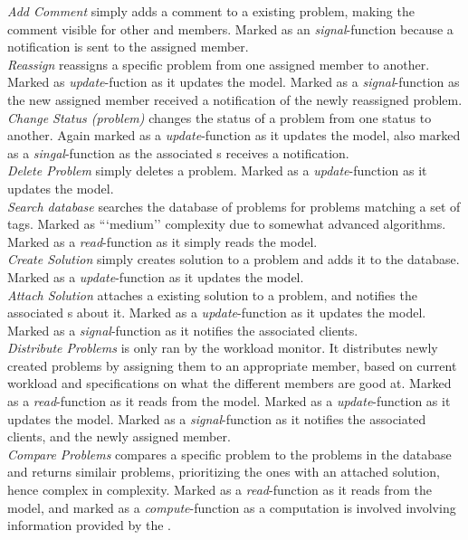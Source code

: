 \emph{Add Comment} simply adds a comment to a existing problem, making the comment visible for other \client and \staff members. Marked as an \textit{signal}-function because a notification is sent to the assigned \staff member.  \\
\emph{Reassign} reassigns a specific problem from one assigned \staff member to another. Marked as \textit{update}-fuction as it updates the model. Marked as a \textit{signal}-function as the new assigned \staff member received a notification of the newly reassigned problem. \\
\emph{Change Status (problem)} changes the status of a problem from one status to another. Again marked as a \textit{update}-function as it updates the model, also marked as a \textit{singal}-function as the associated \client s receives a notification. \\
\emph{Delete Problem} simply deletes a problem. Marked as a \textit{update}-function as it updates the model. \\
\emph{Search database} searches the database of problems for problems matching a set of tags. Marked as ```medium'' complexity due to somewhat advanced algorithms. Marked as a \textit{read}-function as it simply reads the model.\\
\emph{Create Solution} simply creates solution to a problem and adds it to the database. Marked as a \textit{update}-function as it updates the model. \\
\emph{Attach Solution} attaches a existing solution to a problem, and notifies the associated \client s about it. Marked as a \textit{update}-function as it updates the model. Marked as a \textit{signal}-function as it notifies the associated clients. \\
\emph{Distribute Problems} is only ran by the workload monitor. It distributes newly created problems by assigning them to an appropriate \staff member, based on current workload and specifications on what the different \staff members are good at. Marked as a \textit{read}-function as it reads from the model. Marked as a \textit{update}-function as it updates the model. Marked as a \textit{signal}-function as it notifies the associated clients, and the newly assigned \staff member. \\
\emph{Compare Problems} compares a specific problem to the problems in the database and returns similair problems, prioritizing the ones with an attached solution, hence complex in complexity. Marked as a \textit{read}-function as it reads from the model, and marked as a \textit{compute}-function as a computation is involved involving information provided by the \client. \\
